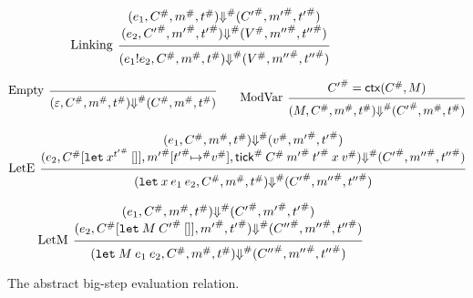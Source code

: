\documentclass[acmsmall,screen]{acmart}
\theoremstyle{definition}
\newcommand*{\A}[1]{{#1}^{\#}}
\newcommand*{\mem}{m}
\newcommand*{\link}[2]{{#1}\mathtt{!}{#2}}
\newcommand*{\tick}{\mathsf{tick}}
\newcommand*{\modctx}{\mathsf{ctx}}
\begin{document}
\begin{figure}[htb]
  \[
    \begin{prooftree}
      \hypo{
        \begin{matrix}
          (e_{1}, \A{C}, \A{\mem}, \A{t})
          \A{\Downarrow}
          (\A{C'}, \A{\mem'}, \A{t'}) \\
          (e_{2}, \A{C'}, \A{\mem'}, \A{t'})
          \A{\Downarrow}
          (\A{V}, \A{\mem''}, \A{t''})
        \end{matrix}
      }
      \infer[left label=Linking]1{
      (\link{e_{1}}{e_{2}}, \A{C}, \A{\mem}, \A{t})
      \A\Downarrow
      (\A{V}, \A{\mem''}, \A{t''})
      }
    \end{prooftree}
  \]

  \[
    \begin{prooftree}
      \infer[left label=Empty]0{
      (\varepsilon, \A{C}, \A{\mem}, \A{t})
      \A{\Downarrow}
      (\A{C}, \A{\mem}, \A{t})
      }
    \end{prooftree}\qquad
    \begin{prooftree}
      \hypo{\A{C'}=\modctx(\A{C},M)}
      \infer[left label=ModVar]1{
      (M, \A{C}, \A{\mem}, \A{t})
      \A{\Downarrow}
      (\A{C'}, \A{\mem}, \A{t})
      }
    \end{prooftree}
  \]

  \[
    \begin{prooftree}
      \hypo{
        \begin{matrix}
          (e_{1}, \A{C}, \A{\mem}, \A{t})
          \A\Downarrow
          (\A{v}, \A{\mem'}, \A{t'}) \\
          (e_{2}, \A{C}[\mathtt{let}\:x^{\A{t'}}\:[]], \A{\mem'}[\A{t'}\A{\mapsto} \A{v}], \A{\tick}\:\A{C}\:\A{\mem'}\:\A{t'}\:x\:\A{v})
          \A\Downarrow
          (\A{C'}, \A{\mem''}, \A{t''})
        \end{matrix}
      }
      \infer[left label=LetE]1{
      (\mathtt{let}\:x\:e_1\:e_2, \A{C}, \A{\mem}, \A{t})
      \A\Downarrow
      (\A{C'}, \A{\mem''}, \A{t''})
      }
    \end{prooftree}
  \]

  \[
    \begin{prooftree}
      \hypo{
        \begin{matrix}
          (e_{1}, \A{C}, \A{\mem}, \A{t})
          \A\Downarrow
          (\A{C'}, \A{\mem'}, \A{t'}) \\
          (e_{2}, \A{C}[\mathtt{let}\:M\:\A{C'}\:[]], \A{\mem'}, \A{t'})
          \A\Downarrow
          (\A{C''}, \A{\mem''}, \A{t''})
        \end{matrix}
      }
      \infer[left label=LetM]1{
      (\mathtt{let}\:M\:e_{1}\:e_{2}, \A{C}, \A{\mem}, \A{t})
      \A\Downarrow
      (\A{C''}, \A{\mem''}, \A{t''})
      }
    \end{prooftree}
  \]
  \caption{The abstract big-step evaluation relation.}
\end{figure}
\end{document}
